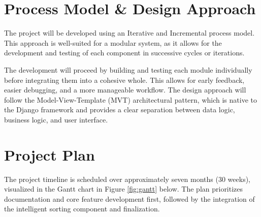 \documentclass[11pt,a4paper]{report}
\begin{document}
\section{Process Model \& Design Approach}
The project will be developed using an Iterative and Incremental process model. This approach is well-suited for a modular system, as it allows for the development and testing of each component in successive cycles or iterations.

The development will proceed by building and testing each module individually before integrating them into a cohesive whole. This allows for early feedback, easier debugging, and a more manageable workflow. The design approach will follow the Model-View-Template (MVT) architectural pattern, which is native to the Django framework and provides a clear separation between data logic, business logic, and user interface.

\section{Project Plan}
The project timeline is scheduled over approximately seven months (30 weeks), visualized in the Gantt chart in Figure \ref{fig:gantt} below. The plan prioritizes documentation and core feature development first, followed by the integration of the intelligent sorting component and finalization.
\end{document}
